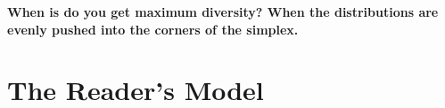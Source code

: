 \documentclass{article}
\begin{document}
{\bf When is do you get maximum diversity? When the distributions are
  evenly pushed into the corners of the simplex.}




\section{The Reader's Model}
\label{sec:the-readers-model}
\end{document}
